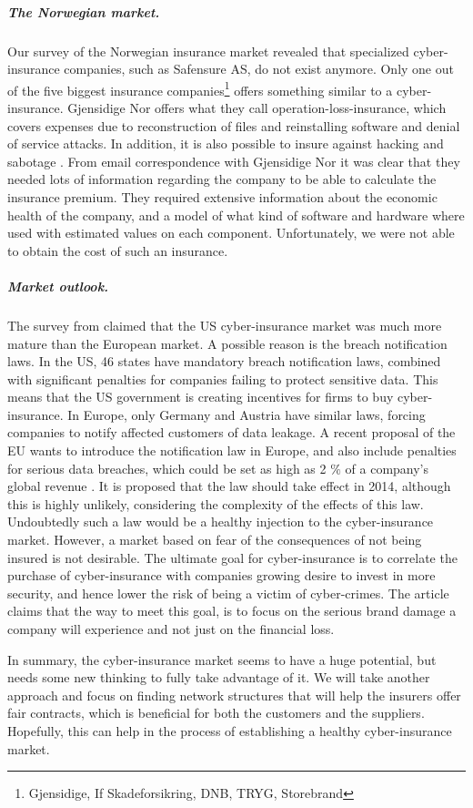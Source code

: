 \subparagraph{The Norwegian market.}
Our survey of the Norwegian insurance market revealed that specialized cyber-insurance companies, such as Safensure AS, do not exist anymore. Only one out of the five biggest insurance companies\footnote{Gjensidige, If Skadeforsikring, DNB, TRYG, Storebrand} offers something similar to a cyber-insurance. Gjensidige Nor offers what they call operation-loss-insurance, which covers expenses due to reconstruction of files and reinstalling software and denial of service attacks. In addition, it is also possible to insure against hacking and sabotage \citep{gjensidige}. From email correspondence with Gjensidige Nor it was clear that they needed lots of information regarding the company to be able to calculate the insurance premium. They required extensive information about the economic health of the company, and a model of what kind of software and hardware where used with estimated values on each component. Unfortunately, we were not able to obtain the cost of such an insurance.
  
\subparagraph{Market outlook.}
The survey from \cite{CFCunder} claimed that the US cyber-insurance market was much more mature than the European market. A possible reason is the breach notification laws. In the US, 46 states have mandatory breach notification laws, combined with significant penalties for companies failing to protect sensitive data. This means that the US government is creating incentives for firms to buy cyber-insurance.
 In Europe, only Germany and Austria have similar laws, forcing companies to notify affected customers of data leakage. A recent proposal of the EU wants to introduce the notification law in Europe, and also include penalties for serious data breaches, which could be set as high as 2 $\%$ of a company's global revenue \cite{CFCunder}. It is proposed that the law should take effect in 2014, although this is highly unlikely, considering the complexity of the effects of this law. Undoubtedly such a law would be a healthy injection to the cyber-insurance market. However, a market based on fear of the consequences of not being insured is not desirable. The ultimate goal for cyber-insurance is to correlate the purchase of cyber-insurance with companies growing desire to invest in more security, and hence lower the risk of being a victim of cyber-crimes. 
The article claims that the way to meet this goal, is to focus on the serious brand damage a company will experience and not just on the financial loss. 

In summary, the cyber-insurance market seems to have a huge potential, but needs some new thinking to fully take advantage of it. We will take another approach and focus on finding network structures that will help the insurers offer fair contracts, which is beneficial for both the customers and the suppliers. Hopefully, this can help in the process of establishing a healthy cyber-insurance market.

   
   
   
   
   
   
   
  

